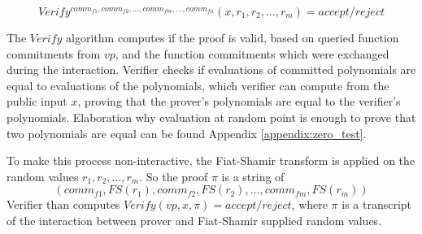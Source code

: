 \[ Verify^{comm_{f1}, comm_{f2}, \dots, comm_{fm}, \ldots, comm_{fn}}(x, r_1, r_2, \dots, r_m) = accept/reject \]

The $Verify$ algorithm computes if the proof is valid, based on queried
function commitments from $vp$, and the function commitments which were
exchanged during the interaction. Verifier checks if evaluations
of committed polynomials are equal to evaluations of the polynomials, which
verifier can compute from the public input $x$, proving that the prover's
polynomials are equal to the verifier's polynomials. Elaboration why evaluation
at random point is enough to prove that two polynomials are equal can be found
Appendix \ref{appendix:zero_test}.

To make this process non-interactive, the Fiat-Shamir transform is applied on
the random values $r_1, r_2, \dots, r_m$. So the proof $\pi$ is a string of 
\[ (comm_{f1}, FS(r_1), comm_{f2}, FS(r_2), \dots, comm_{fm}, FS(r_m)) \]
Verifier than computes $Verify(vp, x, \pi) = accept/reject$, where $\pi$ is
a transcript of the interaction between prover and Fiat-Shamir supplied random
values.
